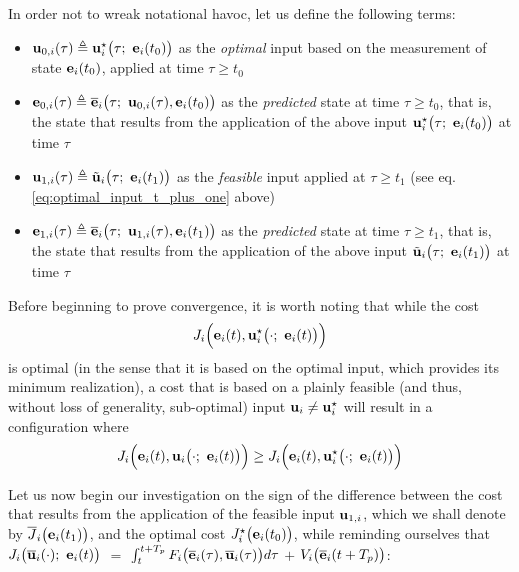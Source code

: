 In order not to wreak notational havoc, let us define the following terms:
\begin{gg_box}
\begin{itemize}
  \item $\bm{\mathbf{u}}_{0,i}(\tau) \triangleq \bm{\mathbf{u}}_i^{\star}\big(\tau;\ \bm{\mathbf{e}}_i(t_0)\big)$
    as the \textit{optimal} input based on the measurement of state
    $\bm{\mathbf{e}}_i(t_0)$, applied at time $\tau \geq t_0$
  \item $\bm{\mathbf{e}}_{0,i}(\tau) \triangleq \overline{\bm{\mathbf{e}}}_i\big(\tau;\ \bm{\mathbf{u}}_{0,i}(\tau), \bm{\mathbf{e}}_i(t_0)\big)$
    as the \textit{predicted} state at time $\tau \geq t_0$, that is,
    the state that results from the application of the above input
    $\vect{u}_i^{\star}\big(\tau;\ \vect{e}_i(t_0)\big)$ at time $\tau$
  \item $\bm{\mathbf{u}}_{1,i}(\tau) \triangleq \tilde{\bm{\mathbf{u}}}_i\big(\tau;\ \bm{\mathbf{e}}_i(t_1)\big)$
    as the \textit{feasible} input applied at $\tau \geq t_1$ (see eq. \eqref{eq:optimal_input_t_plus_one} above)
  \item $\bm{\mathbf{e}}_{1,i}(\tau) \triangleq \overline{\bm{\mathbf{e}}}_i\big(\tau;\ \bm{\mathbf{u}}_{1,i}(\tau), \bm{\mathbf{e}}_i(t_1)\big)$
    as the \textit{predicted} state at time $\tau \geq t_1$, that is,
    the state that results from the application of the above input
    $\tilde{\vect{u}}_i\big(\tau;\ \vect{e}_i(t_1)\big)$ at time $\tau$
\end{itemize}
\end{gg_box}

Before beginning to prove convergence, it is worth noting that while the cost
$$J_i \Big(\bm{\mathbf{e}}_i(t), \bm{\mathbf{u}}_i^{\star}\big(\cdot;\ \bm{\mathbf{e}}_i(t)\big)\Big)$$
is optimal (in the sense that it is based on the optimal input, which provides
its minimum realization), a cost that is based on a plainly feasible
(and thus, without loss of generality, sub-optimal) input
$\bm{\mathbf{u}}_i \not= \bm{\mathbf{u}}_i^{\star}$ will result in a configuration where
\begin{equation}
J_i \Big(\vect{e}_i(t), \vect{u}_i\big(\cdot;\ \vect{e}_i(t)\big)\Big)
\geq J_i \Big(\vect{e}_i(t), \vect{u}_i^{\star}\big(\cdot;\ \vect{e}_i(t)\big)\Big)
\end{equation}

Let us now begin our investigation on the sign of the difference between the cost
that results from the application of the feasible input $\bm{\mathbf{u}}_{1,i}$,
which we shall denote by $\overline{J}_i\big(\bm{\mathbf{e}}_i(t_1)\big)$,
and the optimal cost $J_i^{\star}\big(\bm{\mathbf{e}}_i(t_0)\big)$, while reminding
ourselves that
$J_i \big(\overline{\bm{\mathbf{u}}}_i (\cdot);\ \bm{\mathbf{e}}_i(t)\big)$ $=$
$\int_{t}^{t + T_p} F_i \big(\overline{\bm{\mathbf{e}}}_i(\tau), \overline{\bm{\mathbf{u}}}_i (\tau)\big) d \tau$ $+$
$V_i \big(\overline{\bm{\mathbf{e}}}_i (t + T_p)\big)$:

